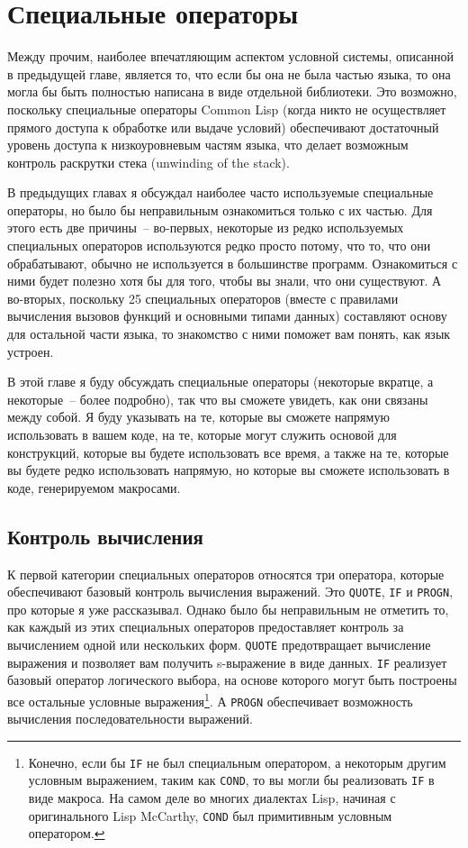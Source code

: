 \chapter{Специальные операторы}
\label{ch:20}

\thispagestyle{empty}

Между прочим, наиболее впечатляющим аспектом условной системы, описанной в предыдущей
главе, является то, что если бы она не была частью языка, то она могла бы быть полностью
написана в виде отдельной библиотеки.  Это возможно, поскольку специальные операторы
Common Lisp (когда никто не осуществляет прямого доступа к обработке или выдаче условий)
обеспечивают достаточный уровень доступа к низкоуровневым частям языка, что делает
возможным контроль раскрутки стека (unwinding of the stack).

В предыдущих главах я обсуждал наиболее часто используемые специальные операторы, но было
бы неправильным ознакомиться только с их частью.  Для этого есть две причины~-- во-первых,
некоторые из редко используемых специальных операторов используются редко просто
потому, что то, что они обрабатывают, обычно не используется в большинстве программ.
Ознакомиться с ними будет полезно хотя бы для того, чтобы вы знали, что они существуют.  А
во-вторых, поскольку 25 специальных операторов (вместе с правилами вычисления вызовов
функций и основными типами данных) составляют основу для остальной части языка, то
знакомство с ними поможет вам понять, как язык устроен.

В этой главе я буду обсуждать специальные операторы (некоторые вкратце, а некоторые~--
более подробно), так что вы сможете увидеть, как они связаны между собой.  Я буду указывать
на те, которые вы сможете напрямую использовать в вашем коде, на те, которые могут служить
основой для конструкций, которые вы будете использовать все время, а также на те, которые
вы будете редко использовать напрямую, но которые вы сможете использовать в коде,
генерируемом макросами.

\section{Контроль вычисления}

К первой категории специальных операторов относятся три оператора, которые обеспечивают
базовый контроль вычисления выражений. Это \lstinline{QUOTE}, \lstinline{IF} и \lstinline{PROGN}, про
которые я уже рассказывал.  Однако было бы неправильным не отметить то, как каждый из этих
специальных операторов предоставляет контроль за вычислением одной или нескольких форм.
\lstinline{QUOTE} предотвращает вычисление выражения и позволяет вам получить s-выражение в
виде данных. \lstinline{IF} реализует базовый оператор логического выбора, на основе которого
могут быть построены все остальные условные выражения\footnote{Конечно, если бы \lstinline{IF}
  не был специальным оператором, а некоторым другим условным выражением, таким как
  \lstinline{COND}, то вы могли бы реализовать \lstinline{IF} в виде макроса.  На самом деле во
  многих диалектах Lisp, начиная с оригинального Lisp McCarthy, \lstinline{COND} был
  примитивным условным оператором.}.  А \lstinline{PROGN} обеспечивает возможность вычисления
последовательности выражений.

